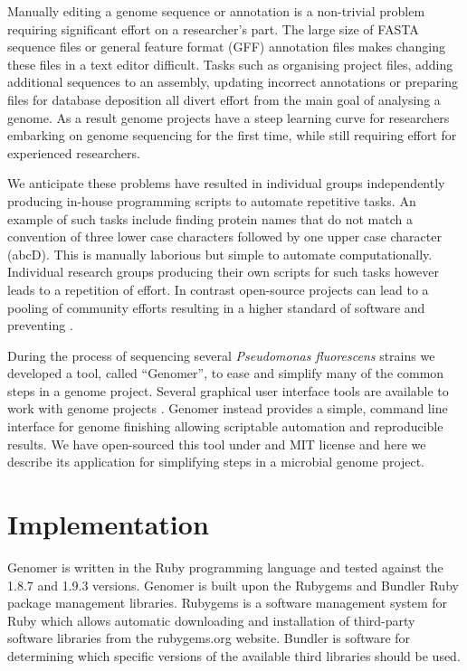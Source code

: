 \documentclass[10pt]{article}
\begin{document}
Manually editing a genome sequence or annotation is a non-trivial problem
requiring significant effort on a researcher's part. The large size of FASTA
sequence files or general feature format (GFF) annotation files makes changing
these files in a text editor difficult. Tasks such as organising project files,
adding additional sequences to an assembly, updating incorrect annotations or
preparing files for database deposition all divert effort from the main goal of
analysing a genome. As a result genome projects have a steep learning curve for
researchers embarking on genome sequencing for the first time, while still
requiring effort for experienced researchers.

We anticipate these problems have resulted in individual groups independently
producing in-house programming scripts to automate repetitive tasks. An example
of such tasks include finding protein names that do not match a convention of
three lower case characters followed by one upper case character (abcD). This
is manually laborious but simple to automate computationally. Individual
research groups producing their own scripts for such tasks however leads to a
repetition of effort. In contrast open-source projects can lead to a pooling of
community efforts resulting in a higher standard of software and preventing
\cite{ince2012}.

During the process of sequencing several \emph{Pseudomonas fluorescens} strains
we developed a tool, called ``Genomer'', to ease and simplify many of the
common steps in a genome project. Several graphical user interface tools are
available to work with genome projects \cite{tanaka2006, wilkinson2002,
lopez2011, carver2012, gordon2003}. Genomer instead provides a simple, command
line interface for genome finishing allowing scriptable automation and
reproducible results. We have open-sourced this tool under and MIT license and
here we describe its application for simplifying steps in a microbial genome
project.

\section*{Implementation}

Genomer is written in the Ruby programming language \cite{ruby-lang,goto2010}
and tested against the 1.8.7 and 1.9.3 versions. Genomer is built upon the
Rubygems and Bundler Ruby package management libraries. Rubygems is a software
management system for Ruby which allows automatic downloading and installation
of third-party software libraries from the rubygems.org website. Bundler is
software for determining which specific versions of the available third
libraries should be used.
\end{document}
